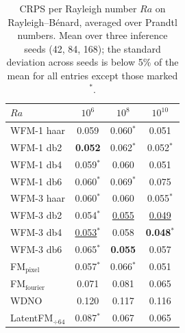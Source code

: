 \begin{table}[ht]
\centering
\caption{CRPS per Rayleigh number $Ra$ on Rayleigh--B\'enard, averaged over Prandtl numbers. Mean over three inference seeds (42, 84, 168); the standard deviation across seeds is below 5\% of the mean for all entries except those marked $^{*}$.}
\label{tab:ablation_rb_crps_ra_main}
\begin{tabular}{lccc}
\toprule
$Ra$ & $10^{6}$ & $10^{8}$ & $10^{10}$ \\
\midrule
WFM-1 haar & 0.059 & 0.060$^{*}$ & 0.051 \\
WFM-1 db2 & \textbf{0.052} & 0.062$^{*}$ & 0.052$^{*}$ \\
WFM-1 db4 & 0.059$^{*}$ & 0.060 & 0.051 \\
WFM-1 db6 & 0.060$^{*}$ & 0.069$^{*}$ & 0.075 \\
\midrule
WFM-3 haar & 0.060$^{*}$ & 0.060 & 0.055$^{*}$ \\
WFM-3 db2 & 0.054$^{*}$ & \underline{0.055} & \underline{0.049} \\
WFM-3 db4 & \underline{0.053}$^{*}$ & 0.058 & \textbf{0.048}$^{*}$ \\
WFM-3 db6 & 0.065$^{*}$ & \textbf{0.055} & 0.057 \\
\midrule
FM$_\text{pixel}$ & 0.057$^{*}$ & 0.066$^{*}$ & 0.051 \\
FM$_\text{fourier}$ & 0.071 & 0.081 & 0.065 \\
WDNO & 0.120 & 0.117 & 0.116 \\
LatentFM$_{\div 64}$ & 0.087$^{*}$ & 0.067 & 0.065 \\
\bottomrule
\end{tabular}
\end{table}
